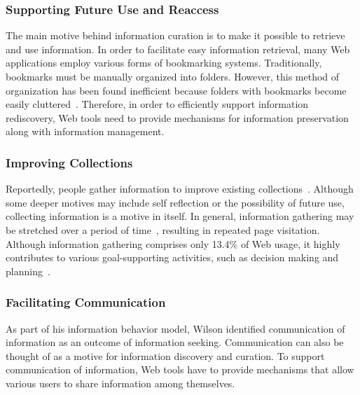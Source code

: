 \documentclass{sigchi}
\begin{document}
{{{\subsubsection{Supporting Future Use and Reaccess}
The main motive behind information curation is to make it possible to retrieve and use information. In order to facilitate easy information retrieval, many Web applications employ various forms of bookmarking systems. Traditionally, bookmarks must be manually organized into folders. However, this method of organization has been found inefficient because folders with bookmarks become easily cluttered~\cite{abrams1998information}. Therefore, in order to efficiently support information rediscovery, Web tools need to provide mechanisms for information preservation along with information management.
}

{\subsubsection{Improving Collections}
Reportedly, people gather information to improve existing collections~\cite{lindley2012s}. Although some deeper motives may include self reflection or the possibility of future use, collecting information is a motive in itself. In general, information gathering may be stretched over a period of time~\cite{kellar2006goal}, resulting in repeated page visitation. Although information gathering comprises only 13.4\% of Web usage, it highly contributes to various goal-supporting activities, such as decision making and planning~\cite{kellar2006goal}.

}

{\subsubsection{Facilitating Communication}
As part of his information behavior model, Wilson identified communication of information as an outcome of information seeking. Communication can also be thought of as a motive for information discovery and curation. To support communication of information, Web tools have to provide mechanisms that allow various users to share information among themselves. 

}}}
\end{document}
